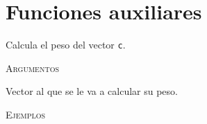 \section{Funciones auxiliares}

\begin{description}[leftmargin=1em, font=\normalfont\ttfamily, style=nextline]
\item[get\_weight(c)]

Calcula el peso del vector \texttt{c}.

\textsc{Argumentos}
\begin{description}[font=\normalfont\ttfamily]
\item[c] Vector al que se le va a calcular su peso.
\end{description}

\textsc{Ejemplos}
\begin{lstlisting}[gobble=4]
% TODO
\end{lstlisting}
\end{description}